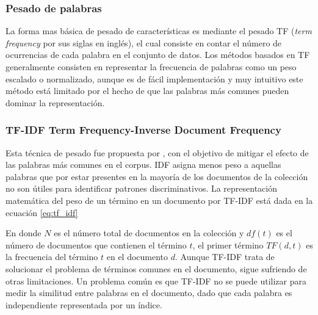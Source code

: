 

\subsubsection{Pesado de palabras}La forma mas básica de pesado de características es mediante el pesado TF (\textit{term frequency} por sus siglas en inglés), el cual consiste en contar el número de ocurrencias de cada palabra en el conjunto de datos. Los métodos basados en TF generalmente consisten en representar la frecuencia de palabras como un peso escalado o normalizado, aunque es de fácil implementación y muy intuitivo este método está limitado por el hecho de que las palabras más comunes pueden dominar la representación.

\subsubsection{TF-IDF Term Frequency-Inverse Document Frequency} Esta técnica de  pesado fue propuesta por \citep{jones1972statistical}, con el objetivo de mitigar el efecto de las palabras más comunes en el corpus. IDF asigna menos peso a aquellas palabras que por estar presentes en la mayoría de los documentos de la colección no son útiles para identificar patrones discriminativos. La representación matemática del peso de un término en un documento por TF-IDF está dada en la ecuación \ref{eq:tf_idf}



En donde $N$ es el número total de documentos en la colección y $df(t)$ es el número de documentos que contienen el término $t$, el primer término $TF(d,t)$ es la frecuencia del término $t$ en el documento $d$. Aunque TF-IDF trata de solucionar el problema de términos comunes en el documento, sigue sufriendo de otras limitaciones. Un problema común es que TF-IDF no se puede utilizar para medir la similitud entre palabras en el documento, dado que cada palabra es independiente representada por un índice.

